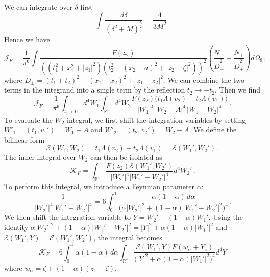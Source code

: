 \documentclass[11pt]{article}
\numberwithin{equation}{section}
\begin{document}
We can integrate over $\delta$ first
\begin{equation}
	\int \frac{d\delta}{(\delta^2 + M)^{\frac{5}{2}}} = \frac{4}{3M^2} \,.
\end{equation}
Hence we have
\begin{equation}
	 \mathcal{J}_F = \frac{1}{\pi^6}\int \frac{F(z_2)}{((t_1^2 + x_1^2 + |z_1|^2)(t_2^2 + (x_2 - a)^2 + |z_2 - \zeta|^2) )^2}\left(\frac{N_-}{\widetilde{D}_-^2} + \frac{N_+}{\widetilde{D}_+^2}\right)d\Omega_{8} \,,
\end{equation} 
where $\widetilde{D}_{\pm} = (t_1 \pm t_2)^2 + (x_1-x_2)^2 + |z_1-z_2|^2$. We can combine the two terms in the integrand into a single term by the reflection $t_2\to -t_2$. Then we find
\begin{equation} 
	\mathcal{J}_F = \frac{1}{\pi^6} \int_{t_1>0} d^4W_1 \int_{\mathbb R^4} d^4W_2 \frac{ F(z_2)\bigl(t_1\Lambda(v_2)-t_2\Lambda(v_1)\bigr)}{|W_1|^4\,|W_2-A|^4\,|W_1-W_2|^4}\,.
\end{equation}
To evaluate the \(W_2\)-integral, we first shift the integration variables by setting $W'_1 = (t_1,v_1') =  W_1-A$ and $W'_2 = (t_2,v_2') =  W_2-A$. We define the bilinear form
\begin{equation}
	\mathcal{E}(W_1,W_2) = t_1\Lambda(v_2)-t_2\Lambda(v_1) = \mathcal{E}(W_1',W_2') \,.
\end{equation}
The inner integral over $W_2$ can then be isolated as
\begin{equation}
\mathcal{K}_F = \int_{\mathbb R^4}\frac{F(z_2)\mathcal{E}(W_1',W_2')}{|W_2'|^4|W_1'-W_2'|^4}d^4W_2'\,.
\end{equation}
To perform this integral, we introduce a Feynman parameter $\alpha$:
\begin{equation}
\frac1{|W_2'|^4|W_1'-W_2'|^4}= 6\int_0^1 \frac{\alpha(1-\alpha)\,d\alpha}{\bigl(\alpha|W_2'|^2+(1-\alpha)|W_1'-W_2'|^2\bigr)^4}\,.
\end{equation}
We then shift the integration variable to $Y=W_2'-(1-\alpha)W_1'$.
Using the identity $\alpha|W_2'|^2+(1-\alpha)|W_1'-W_2'|^2=|Y|^2+\alpha(1-\alpha)|W_1'|^2$ and $\mathcal{E}(W_1',Y) = \mathcal{E}(W_1',W_2')$, the integral becomes
\begin{equation}
\mathcal{K}_F = 6\int_0^1\alpha(1-\alpha)\,d\alpha \int_{\mathbb R^4}
\frac{\mathcal{E}(W_1',Y)F(w_\alpha+Y_z)}{\bigl(|Y|^2+\alpha(1-\alpha)|W_1'|^2\bigr)^4}d^4Y
\end{equation}
where $w_\alpha=\zeta+(1-\alpha)(z_1-\zeta)$.
\end{document}
